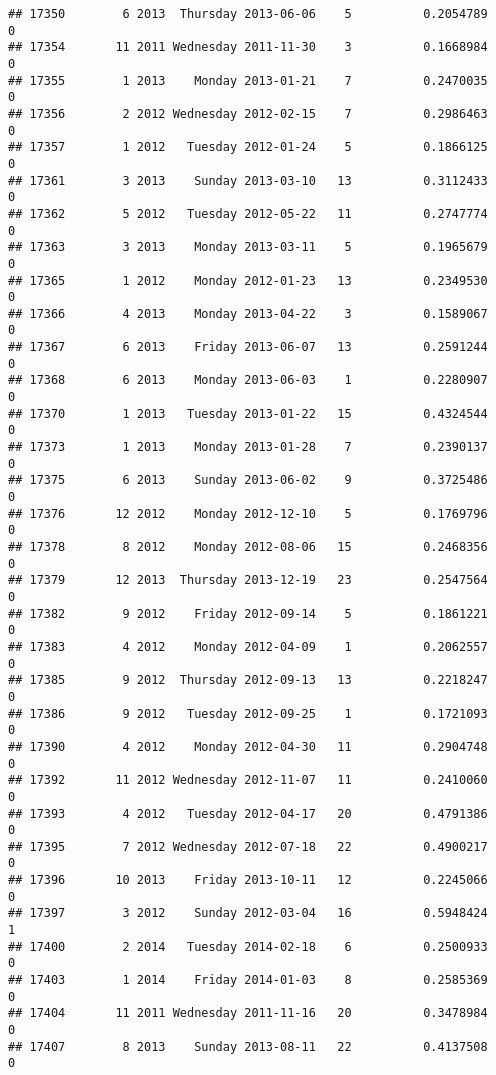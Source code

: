 \documentclass[
]{article}
\begin{document}
\begin{verbatim}
## 17350        6 2013  Thursday 2013-06-06    5          0.2054789             0
## 17354       11 2011 Wednesday 2011-11-30    3          0.1668984             0
## 17355        1 2013    Monday 2013-01-21    7          0.2470035             0
## 17356        2 2012 Wednesday 2012-02-15    7          0.2986463             0
## 17357        1 2012   Tuesday 2012-01-24    5          0.1866125             0
## 17361        3 2013    Sunday 2013-03-10   13          0.3112433             0
## 17362        5 2012   Tuesday 2012-05-22   11          0.2747774             0
## 17363        3 2013    Monday 2013-03-11    5          0.1965679             0
## 17365        1 2012    Monday 2012-01-23   13          0.2349530             0
## 17366        4 2013    Monday 2013-04-22    3          0.1589067             0
## 17367        6 2013    Friday 2013-06-07   13          0.2591244             0
## 17368        6 2013    Monday 2013-06-03    1          0.2280907             0
## 17370        1 2013   Tuesday 2013-01-22   15          0.4324544             0
## 17373        1 2013    Monday 2013-01-28    7          0.2390137             0
## 17375        6 2013    Sunday 2013-06-02    9          0.3725486             0
## 17376       12 2012    Monday 2012-12-10    5          0.1769796             0
## 17378        8 2012    Monday 2012-08-06   15          0.2468356             0
## 17379       12 2013  Thursday 2013-12-19   23          0.2547564             0
## 17382        9 2012    Friday 2012-09-14    5          0.1861221             0
## 17383        4 2012    Monday 2012-04-09    1          0.2062557             0
## 17385        9 2012  Thursday 2012-09-13   13          0.2218247             0
## 17386        9 2012   Tuesday 2012-09-25    1          0.1721093             0
## 17390        4 2012    Monday 2012-04-30   11          0.2904748             0
## 17392       11 2012 Wednesday 2012-11-07   11          0.2410060             0
## 17393        4 2012   Tuesday 2012-04-17   20          0.4791386             0
## 17395        7 2012 Wednesday 2012-07-18   22          0.4900217             0
## 17396       10 2013    Friday 2013-10-11   12          0.2245066             0
## 17397        3 2012    Sunday 2012-03-04   16          0.5948424             1
## 17400        2 2014   Tuesday 2014-02-18    6          0.2500933             0
## 17403        1 2014    Friday 2014-01-03    8          0.2585369             0
## 17404       11 2011 Wednesday 2011-11-16   20          0.3478984             0
## 17407        8 2013    Sunday 2013-08-11   22          0.4137508             0

\end{verbatim}
\end{document}
